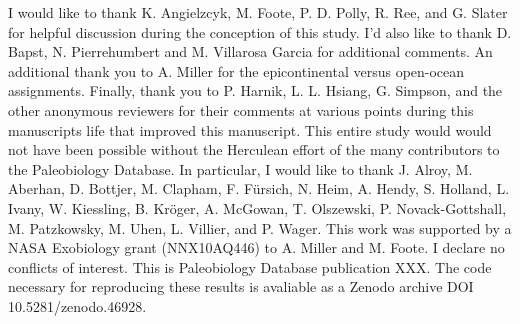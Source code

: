 \documentclass[11pt]{article}
\begin{document}
I would like to thank K. Angielzcyk, M. Foote, P. D. Polly, R. Ree, and G. Slater for helpful discussion during the conception of this study. I'd also like to thank D. Bapst, N. Pierrehumbert and M. Villarosa Garcia for additional comments. An additional thank you to  A. Miller for the epicontinental versus open-ocean assignments. Finally, thank you to P. Harnik, L. L. Hsiang, G. Simpson, and the other anonymous reviewers for their comments at various points during this manuscripts life that improved this manuscript. This entire study would would not have been possible without the Herculean effort of the many contributors to the Paleobiology Database. In particular, I would like to thank J. Alroy, M. Aberhan, D. Bottjer, M. Clapham, F. F\"{u}rsich, N. Heim, A. Hendy, S. Holland, L. Ivany, W. Kiessling, B. Kr\"{o}ger, A. McGowan, T. Olszewski, P. Novack-Gottshall, M. Patzkowsky, M. Uhen, L. Villier, and P. Wager. This work was supported by a NASA Exobiology grant (NNX10AQ446) to A. Miller and M. Foote. I declare no conflicts of interest. This is Paleobiology Database publication XXX. The code necessary for reproducing these results is avaliable as a Zenodo archive DOI 10.5281/zenodo.46928.

\newpage{}




\end{document}
